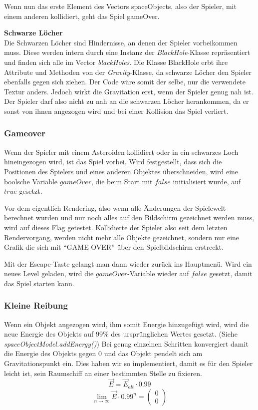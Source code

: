 \documentclass[12pt,a4paper]{scrartcl}
\newcommand{\q}[1]{``#1''}
\begin{document}
Wenn nun das erste Element des Vectors spaceObjects, also der Spieler, mit einem anderen kollidiert, geht das Spiel gameOver.

\textbf{Schwarze Löcher}		\\
Die Schwarzen Löcher sind Hindernisse, an denen der Spieler vorbeikommen muss.
Diese werden intern durch eine Instanz der \textit{BlackHole}-Klasse repräsentiert und finden sich alle im Vector \textit{blackHoles}.
Die Klasse BlackHole erbt ihre Attribute und Methoden von der \textit{Gravity}-Klasse, da schwarze Löcher den Spieler ebenfalls gegen sich ziehen.
Der Code wäre somit der selbe, nur die verwendete Textur anders. Jedoch wirkt die Gravitation erst, wenn der Spieler genug nah ist. Der Spieler darf also nicht zu nah an die schwarzen Löcher herankommen, da er sonst
von ihnen angezogen wird und bei einer Kollision das Spiel verliert. 


\subsubsection{Gameover}
Wenn der Spieler mit einem Asteroiden kollidiert oder in ein schwarzes Loch
hineingezogen wird, ist das Spiel vorbei. Wird festgestellt, dass sich die 
Positionen des Spielers und eines anderen Objektes überschneiden, wird eine boolsche
Variable $gameOver$, die beim Start mit $false$ initialisiert wurde, auf $true$ gesetzt.

Vor dem eigentlich Rendering, also wenn alle Änderungen der Spielewelt berechnet wurden
und nur noch alles auf den Bildschirm gezeichnet werden muss, wird auf dieses Flag getestet.
Kollidierte der Spieler also seit dem letzten Rendervorgang, werden nicht mehr alle Objekte
gezeichnet, sondern nur eine Grafik die sich mit \q{GAME OVER} über den Spielbildschirm erstreckt.

Mit der Escape-Taste gelangt man dann wieder zurück ins Hauptmenü. Wird ein neues Level geladen,
wird die $gameOver$-Variable wieder auf $false$ gesetzt, damit das Spiel starten kann.


\subsubsection{Kleine Reibung}
Wenn ein Objekt angezogen wird, ihm somit Energie hinzugefügt wird, wird die neue Energie des Objekts auf 99\%
des ursprünglichen Wertes gesetzt. (Siehe \textit{spaceObjectModel.addEnergy()}) Bei genug einzelnen Schritten konvergiert damit die Energie des Objekts gegen 0 und
das Objekt pendelt sich am Gravitationspunkt ein. Dies haben wir so implementiert, damit es für den Spieler leicht ist,
sein Raumschiff an einer bestimmten Stelle zu fixieren.
\[ \vec{E} = \vec{E}_{alt} \cdot 0.99 \]
\[ \lim_{n\rightarrow \infty} \vec{E} \cdot 0.99^n = \begin{pmatrix}0\\0\end{pmatrix} \] 
\end{document}
